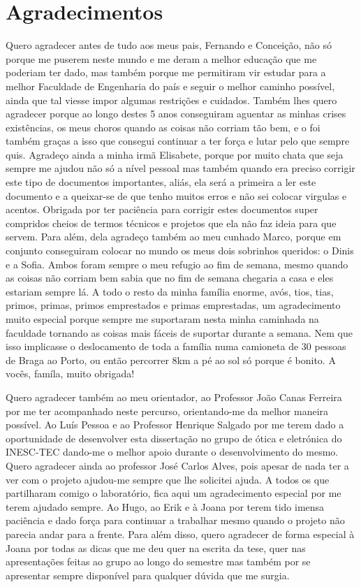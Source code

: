 \chapter*{Agradecimentos}
Quero agradecer antes de tudo aos meus pais, Fernando e Conceição, não só porque me puserem neste mundo e me deram a melhor educação que me poderiam ter dado, mas também porque me permitiram vir estudar para a melhor Faculdade de Engenharia do país e seguir o melhor caminho possível, ainda que tal viesse impor algumas restrições e cuidados. Também lhes quero agradecer porque ao longo destes 5 anos conseguiram aguentar as minhas crises existências, os meus choros quando as coisas não corriam tão bem, e o foi também graças a isso que consegui continuar a ter força e lutar pelo que sempre quis. Agradeço ainda a minha irmã Elisabete, porque por muito chata que seja sempre me ajudou não só a nível pessoal mas também quando era preciso corrigir este tipo de documentos importantes, aliás, ela será a primeira a ler este documento e a queixar-se de que tenho muitos erros e não sei colocar virgulas e acentos. Obrigada por ter paciência para corrigir estes documentos super compridos cheios de termos técnicos e projetos que ela não faz ideia para que servem. Para além, dela agradeço também ao meu cunhado Marco, porque em conjunto conseguiram colocar no mundo os meus dois sobrinhos queridos: o Dinis e a Sofia. Ambos foram sempre o meu refugio ao fim de semana, mesmo quando as coisas não corriam bem sabia que no fim de semana chegaria a casa e eles estariam sempre lá. A todo o resto da minha família enorme, avós, tios, tias, primos, primas, primos emprestados e primas emprestadas, um agradecimento muito especial porque sempre me suportaram nesta minha caminhada na faculdade tornando as coisas mais fáceis de suportar durante a semana. Nem que isso implicasse o deslocamento de toda a família numa camioneta de 30 pessoas de Braga ao Porto, ou então percorrer 8km a pé ao sol só porque é bonito. A vocês, famíla, muito obrigada!

Quero agradecer também ao meu orientador, ao Professor João Canas Ferreira por me ter acompanhado neste percurso, orientando-me da melhor maneira possível. Ao Luís Pessoa e ao Professor Henrique Salgado por me terem dado a oportunidade de desenvolver esta dissertação no grupo de ótica e eletrónica do INESC-TEC dando-me o melhor apoio durante o desenvolvimento do mesmo. Quero agradecer ainda ao professor José Carlos Alves, pois apesar de nada ter a ver com o projeto ajudou-me sempre que lhe solicitei ajuda.  A todos os que partilharam comigo o laboratório, fica aqui um agradecimento especial por me terem ajudado sempre. Ao Hugo, ao Erik e à Joana por terem tido imensa paciência e dado força para continuar a trabalhar mesmo quando o projeto não parecia andar para a frente. Para além disso, quero agradecer de forma especial à Joana por todas as dicas que me deu quer na escrita da tese, quer nas apresentações feitas ao grupo ao longo do semestre mas também por se apresentar sempre disponível para qualquer dúvida que me surgia. 

